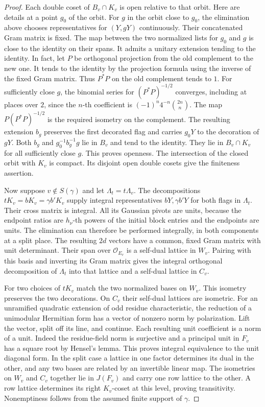 \documentclass[a4paper,11pt]{article}
\theoremstyle{definition}
\theoremstyle{remark}
\numberwithin{equation}{section}
\begin{document}
\begin{proof}
Each double coset of \(B_v\cap K_v\) is open relative to that orbit.
Here are details at a point \(g_0\) of the orbit. For \(g\) in the
orbit close to \(g_0\), the elimination above chooses representatives
for \((Y,gY)\) continuously. Their concatenated Gram matrix is fixed.
The map between the two normalized lists for \(g_0\) and \(g\) is
close to the identity on their spans. It admits a unitary extension
tending to the identity. In fact, let \(P\) be orthogonal projection
from the old complement to the new one. It tends to the identity by
the projection formula using the inverse of the fixed Gram matrix.
Thus \(P^*P\) on the old complement tends to \(1\). For sufficiently
close \(g\), the binomial series for \((P^*P)^{-1/2}\) converges,
including at places over \(2\), since the \(n\)-th coefficient is
\((-1)^n4^{-n}\binom{2n}{n}\). The map
\(P(P^*P)^{-1/2}\) is the required isometry on the complement.
The resulting extension \(b_g\) preserves the first decorated flag
and carries \(g_0Y\) to the decoration of \(gY\). Both \(b_g\) and
\(g_0^{-1}b_g^{-1}g\) lie in \(B_v\) and tend to the identity.
They lie in \(B_v\cap K_v\) for all sufficiently close \(g\).
This proves openness. The intersection of the closed orbit with
\(K_v\) is compact. Its disjoint open double cosets give the
finiteness assertion.

Now suppose \(v\notin S(\gamma)\) and let \(\Lambda_t=t\Lambda_v\).
The decompositions \(tK_v=bK_v=\gamma b'K_v\) supply integral
representatives \(bY,\gamma b'Y\) for both flags in \(\Lambda_t\).
Their cross matrix is integral. All its Gaussian pivots are units,
because the endpoint ratios are \(h_\nu\)-th powers of the initial
block entries and the endpoints are units. The elimination can
therefore be performed integrally, in both components at a split
place. The resulting \(2d\) vectors have a common, fixed Gram
matrix with unit determinant. Their span over \(\mathcal O_{E_v}\)
is a self-dual lattice in \(W_v\). Pairing with this basis and
inverting its Gram matrix gives the integral orthogonal decomposition
of \(\Lambda_t\) into that lattice and a self-dual lattice in \(C_v\).

For two choices of \(tK_v\) match the two normalized bases on \(W_v\).
This isometry preserves the two decorations. On \(C_v\) their
self-dual lattices are isometric. For an unramified quadratic
extension of odd residue characteristic, the reduction of a
unimodular Hermitian form has a vector of nonzero norm
by polarization. Lift the vector, split off its line, and continue.
Each resulting unit coefficient is a norm of a unit. Indeed the
residue-field norm is surjective and a principal unit in \(F_v\)
has a square root by Hensel's lemma. This proves integral equivalence
to the unit diagonal form. In the split case a lattice in one
factor determines its dual in the other, and any two bases are
related by an invertible linear map. The isometries on \(W_v\)
and \(C_v\) together lie in \(J(F_v)\) and carry one row lattice
to the other. A row lattice determines its right \(K_v\)-coset at
this level, proving transitivity. Nonemptiness follows from the
assumed finite support of \(\gamma\).


\end{proof}
\end{document}
